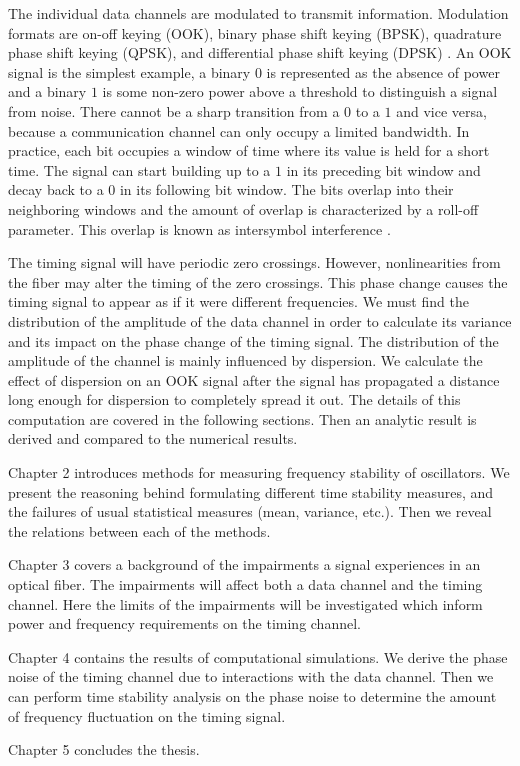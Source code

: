 The individual data channels are modulated to transmit information.  Modulation formats are on-off keying (OOK), binary phase shift keying (BPSK), quadrature phase shift keying (QPSK), and differential phase shift keying (DPSK) \cite{agrawal2012fiber}.  An OOK signal is the simplest example, a binary $0$ is represented as the absence of power and a binary $1$ is some non-zero power above a threshold to distinguish a signal from noise.  There cannot be a sharp transition from a $0$ to a $1$ and vice versa, because a communication channel can only occupy a limited bandwidth.  In practice, each bit occupies a window of time where its value is held for a short time.  The signal can start building up to a $1$ in its preceding bit window and decay back to a $0$ in its following bit window.  The bits overlap into their neighboring windows and the amount of overlap is characterized by a roll-off parameter.  This overlap is known as intersymbol interference \cite{proakis2001digital}.

The timing signal will have periodic zero crossings.  However, nonlinearities from the fiber may alter the timing of the zero crossings.  This phase change causes the timing signal to appear as if it were different frequencies.  We must find the distribution of the amplitude of the data channel in order to calculate its variance and its impact on the phase change of the timing signal.  The distribution of the amplitude of the channel is mainly influenced by dispersion.  We calculate the effect of dispersion on an OOK signal after the signal has propagated a distance long enough for dispersion to completely spread it out.  The details of this computation are covered in the following sections.  Then an analytic result is derived and compared to the numerical results.


Chapter 2 introduces methods for measuring frequency stability of oscillators. We present the reasoning behind formulating different time stability measures, and the failures of usual statistical measures (mean, variance, etc.). Then we reveal the relations between each of the methods.

Chapter 3 covers a background of the impairments a signal experiences in an optical fiber.  The impairments will affect both a data channel and the timing channel. Here the limits of the impairments will be investigated which inform power and frequency requirements on the timing channel.

Chapter 4 contains the results of computational simulations. We derive the phase noise of the timing channel due to interactions with the data channel. Then we can perform time stability analysis on the phase noise to determine the amount of frequency fluctuation on the timing signal.

Chapter 5 concludes the thesis.



